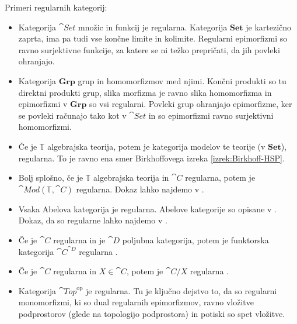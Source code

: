 \documentclass[../kategoricna_logika.tex]{subfiles}
\begin{document}
\begin{primer}
  Primeri regularnih kategorij:
  \begin{itemize}
  \item Kategorija $\cat{Set}$ množic in funkcij je
    regularna. Kategorija $\mathbf{Set}$ je kartezično zaprta,
    ima pa tudi vse končne limite in kolimite.  Regularni epimorfizmi
    so ravno surjektivne funkcije, za katere se ni težko prepričati,
    da jih povleki ohranjajo.
  \item Kategorija $\mathbf{Grp}$ grup in homomorfizmov med njimi.
    Končni produkti so tu direktni produkti grup, slika morfizma je ravno slika
    homomorfizma in epimorfizmi v $\mathbf{Grp}$ so vsi regularni.
    Povleki grup ohranjajo epimorfizme, ker se povleki računajo tako kot v $\cat{Set}$
    in so epimorfizmi ravno surjektivni homomorfizmi.
  \item Če je $\mathbb{T}$ algebrajska teorija, potem je kategorija
    modelov te teorije (v $\mathbf{Set}$), regularna.
    To je ravno ena smer Birkhoffovega izreka
    \ref{izrek:Birkhoff-HSP}.
  \item Bolj splošno, če je $\mathbb{T}$ algebrajska teorija in
    $\cat{C}$ regularna, potem je $\cat{Mod}(\mathbb{T}, \cat{C})$
    regularna. Dokaz lahko najdemo v \cite{barr-exact-categories}.
  \item Vsaka Abelova kategorija je regularna. Abelove kategorije
    so opisane v \cite{freyd1964abelian}. Dokaz, da so regularne
    lahko najdemo v \cite{borceux1994handbook}.
  \item Če je $\cat{C}$ regularna in je $\cat{D}$ poljubna kategorija,
    potem je funktorska kategorija $\cat{C}^{\cat{D}}$ regularna \cite{borceux1994handbook}.
  \item Če je $\cat{C}$ regularna in $X \in \cat{C}$, potem je
    $\cat{C}/X$ regularna \cite{borceux1994handbook}.
  \item Kategorija $\cat{Top}^{\mathrm{op}}$ je regularna. Tu je
    ključno dejstvo to, da so regularni monomorfizmi, ki so dual
    regularnih epimorfizmov, ravno vložitve podprostorov (glede na
    topologijo podprostora) in potiski so spet vložitve.
  \end{itemize}
\end{primer}
\end{document}

